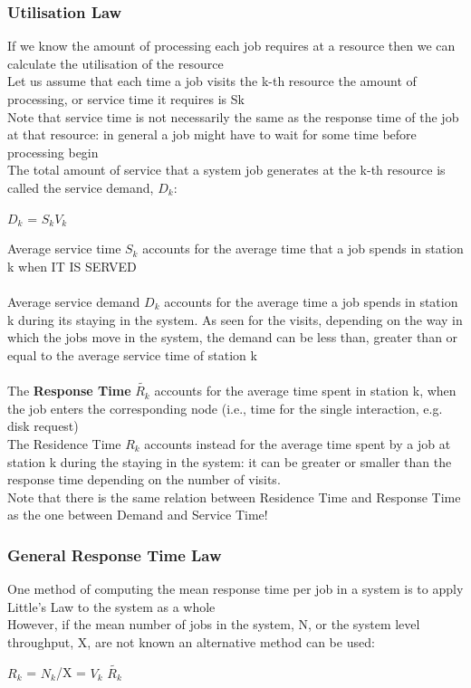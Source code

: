 \documentclass[10pt, oneside]{article}
\begin{document}
\subsubsection{Utilisation Law}If we know the amount of processing each job requires at a resource then we can calculate the utilisation of the resource\\ Let us assume that each time a job visits the k-th resource the amount of processing, or service time it requires is Sk\\ Note that service time is not necessarily the same as the response time of the job at that resource: in general a job might have to wait for some time before processing begin\\ The total amount of service that a system job generates at the k-th resource is called the service demand, $D_k$:
\begin{center}
    $D_k$ = $S_k$$V_k$
\end{center}
Average service time $S_k$ accounts for the average time that a
job spends in station k when IT IS SERVED\\\\ 
Average service demand $D_k$ accounts for the average time a job spends in station k during its staying in the system. As seen for the visits, depending on the way in which the jobs move in the system, the demand can be less than, greater than or equal to the average service time of station k\\\\
The {\bf Response Time} $\widetilde{R_k}$ accounts for the average time spent in station k, when the job enters the corresponding node (i.e., time for the single interaction, e.g. disk request)\\The Residence Time $R_k$ accounts instead for the average time spent by a job at station k during the staying in the system: it can be greater or smaller than the response time depending on the number of visits.\\Note that there is the same relation between Residence Time and Response Time as the one between Demand and Service Time!
\subsubsection{General Response Time Law}One method of computing the mean response time per job in a system is to apply Little's Law to the system as a whole\\ However, if the mean number of jobs in the system, N, or the system level throughput, X, are not known an alternative method can be used:\begin{center}
    $R_k$ = $N_k$/X = $V_k$ $\widetilde{R_k}$
\end{center}

 
 

\end{document}
